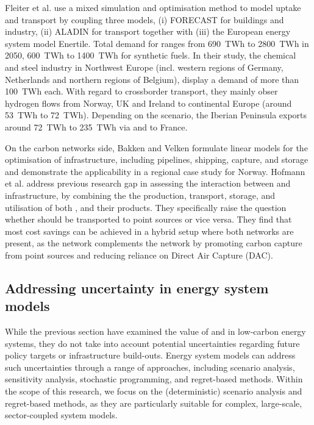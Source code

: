 \documentclass[preprint,12pt,sort&compress]{elsarticle}
\begin{document}
Fleiter et al. \cite{fleiterHydrogenInfrastructureFuture2025} use a mixed simulation and optimisation method to model  uptake and transport by coupling three models, (i) FORECAST for buildings and industry, (ii) ALADIN for transport together with (iii) the European energy system model Enertile. Total demand for  ranges from \SI{690}{TWh} to \SI{2800}{TWh} in 2050, \SI{600}{TWh} to \SI{1400}{TWh} for synthetic fuels. In their study, the  chemical and steel industry in Northwest Europe (incl. western regions of Germany, Netherlands and northern regions of Belgium), display a demand of more than \SI{100}{TWh} each. With regard to crossborder transport, they mainly obser hydrogen flows from Norway, UK and Ireland to continental Europe (around \SI{53}{TWh} to \SI{72}{TWh}). Depending on the scenario, the Iberian Peninsula exports around \SI{72}{TWh} to \SI{235}{TWh} via and to France.

On the carbon networks side, Bakken and Velken \cite{bakkenLinearModelsOptimization2008} formulate linear models for the optimisation of  infrastructure, including pipelines, shipping,  capture, and storage and demonstrate the applicability in a regional case study for Norway.
Hofmann et al. \cite{hofmannH2CO2Network2025} address previous research gap in assessing the interaction between  and  infrastructure, by combining the the production, transport, storage, and utilisation of both ,  and their products. They specifically raise the question whether  should be transported to  point sources or vice versa. They find that most cost savings can be achieved in a hybrid setup where both networks are present, as the  network complements the  network by promoting carbon capture from point sources and reducing reliance on Direct Air Capture (DAC).
 
\subsection{Addressing uncertainty in energy system models}
While the previous section have examined the value of  and  in low-carbon energy systems, they do not take into account potential uncertainties regarding future policy targets or infrastructure build-outs. 
Energy system models can address such uncertainties through a range of approaches, including scenario analysis, sensitivity analysis, stochastic programming, and regret-based methods. Within the scope of this research, we focus on the (deterministic) scenario analysis and regret-based methods, as they are particularly suitable for complex, large-scale, sector-coupled system models.
\end{document}
